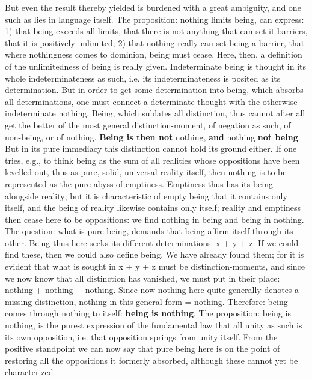 \documentclass[12pt,a4paper,openany]{book}
\newcommand{\opage}[1]{\marginnote{\footnotesize\textit{[#1]}}}
\begin{document}
But even the result thereby yielded is burdened
with a great ambiguity, and one such as lies
in language itself. The proposition: nothing limits being,
can express: 1) that being exceeds all limits,
that there is not anything that can set it barriers, that it is positively unlimited; 2) that nothing really
can set being a barrier, that where nothingness
comes to dominion, being must cease. Here, then, a definition of the unlimitedness of being is really given. Indeterminate being is thought in
its whole indeterminateness as such, i.e. its indeterminateness
is posited as its determination. But in order to get some
determination into being, which absorbs all determinations, one must connect a determinate thought with the
\setcounter{footnote}{0}%
\opage{4}otherwise indeterminate nothing. Being, which sublates all distinction,
thus cannot after all get the better of the most general distinction-moment,
of negation as such,
of non-being, or of nothing. \textbf{Being is then
not} nothing, \textbf{and} nothing \textbf{not being}. But in its pure immediacy this distinction
cannot hold its ground either. If one tries, e.g., to think
being as the sum of all realities whose oppositions
have been levelled out, thus as pure, solid,
universal reality itself, then nothing is to be represented
as the pure abyss of emptiness. Emptiness thus has
its being alongside reality; but it is characteristic
of empty being that it contains only
itself, and the being of reality likewise contains
only itself; reality and emptiness then cease here to
be oppositions: we find nothing in being and being
in nothing. The question: what is pure being,
demands that being affirm itself through its other.
Being thus here seeks its different determinations:
x + y + z. If we could find these, then we could
also define being. We have already found
them; for it is evident that what is sought in x + y + z must be distinction-moments, and since we now know that all
distinction has vanished, we must put in their place: nothing + nothing + nothing. Since now nothing here quite
generally denotes a missing distinction, nothing in this general form = nothing. Therefore: being
comes through nothing to itself: \textbf{being is
nothing}. The proposition: being is nothing, is the purest
expression of the fundamental law that all unity as such
is its own opposition, i.e. that opposition springs
from unity itself. From the positive standpoint we can now say that pure being here is on the point of
\setcounter{footnote}{0}%
\opage{5}restoring all the oppositions it formerly
absorbed, although these cannot yet be characterized
\end{document}
